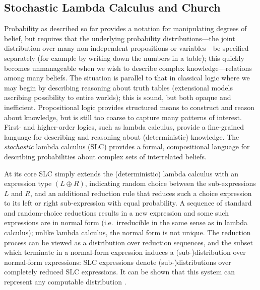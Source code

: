 \documentclass[pdfextras]{handbook}
\begin{document}
\subsection{Stochastic Lambda Calculus and Church}


Probability as described so far provides a notation for manipulating degrees of belief, but requires that the underlying probability distributions---the joint distribution over many non-independent propositions or variables---be specified separately (for example by writing down the numbers in a table); this quickly becomes unmanageable when we wish to describe complex knowledge---relations among many beliefs. 
The situation is parallel to that in classical logic where we may begin by describing reasoning about truth tables (extensional models ascribing possibility to entire worlds); this is sound, but both opaque and inefficient. Propositional logic provides structured means to construct and reason about knowledge, but is still too coarse to capture many patterns of interest. First- and higher-order logics, such as lambda calculus, provide a fine-grained language for describing and reasoning about (deterministic) knowledge.
The \emph{stochastic} lambda calculus (SLC) provides a formal, compositional language for describing probabilities about complex sets of interrelated beliefs.
 
At its core SLC simply extends the (deterministic) lambda calculus \citep{barendregt1985lambda,hindley1986introduction} with an expression type $(L \oplus R)$, indicating random choice between the sub-expressions $L$ and $R$, and an additional reduction rule that reduces such a choice expression to its left or right sub-expression with equal probability. 
A sequence of standard and random-choice reductions results in a new expression and some such expressions are in normal form (i.e.~irreducible in the same sense as in lambda calculus); unlike lambda calculus, the normal form is not unique.
The reduction process can be viewed as a distribution over reduction sequences, and the subset which terminate in a normal-form expression induces a (sub-)distribution over normal-form expressions: SLC expressions denote (sub-)distributions over completely reduced SLC expressions. 
It can be shown that this system can represent any computable distribution \cite[see, for example][]{ramsey2002stochastic,freer2012computable}.
\end{document}
